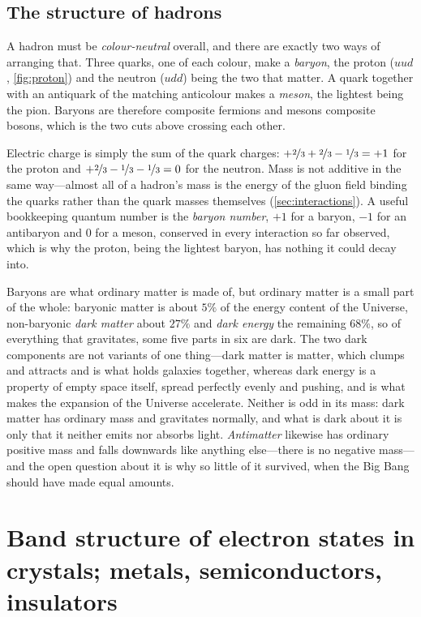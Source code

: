     \subsection{The structure of hadrons}

        A hadron must be \emph{colour-neutral} overall, and there are exactly two ways of arranging that. Three quarks, one of each colour, make a \emph{baryon}, the proton ($uud$, \cref{fig:proton}) and the neutron ($udd$) being the two that matter. A quark together with an antiquark of the matching anticolour makes a \emph{meson}, the lightest being the pion. Baryons are therefore composite fermions and mesons composite bosons, which is the two cuts above crossing each other.

        Electric charge is simply the sum of the quark charges: $+\nicefrac{2}{3}+\nicefrac{2}{3}-\nicefrac{1}{3}=+1$ for the proton and $+\nicefrac{2}{3}-\nicefrac{1}{3}-\nicefrac{1}{3}=0$ for the neutron. Mass is not additive in the same way---almost all of a hadron's mass is the energy of the gluon field binding the quarks rather than the quark masses themselves (\cref{sec:interactions}). A useful bookkeeping quantum number is the \emph{baryon number}, $+1$ for a baryon, $-1$ for an antibaryon and $0$ for a meson, conserved in every interaction so far observed, which is why the proton, being the lightest baryon, has nothing it could decay into.

        Baryons are what ordinary matter is made of, but ordinary matter is a small part of the whole: baryonic matter is about $5\%$ of the energy content of the Universe, non-baryonic \emph{dark matter} about $27\%$ and \emph{dark energy} the remaining $68\%$, so of everything that gravitates, some five parts in six are dark. The two dark components are not variants of one thing---dark matter is matter, which clumps and attracts and is what holds galaxies together, whereas dark energy is a property of empty space itself, spread perfectly evenly and pushing, and is what makes the expansion of the Universe accelerate. Neither is odd in its mass: dark matter has ordinary mass and gravitates normally, and what is dark about it is only that it neither emits nor absorbs light. \emph{Antimatter} likewise has ordinary positive mass and falls downwards like anything else---there is no negative mass---and the open question about it is why so little of it survived, when the Big Bang should have made equal amounts.

\section{Band structure of electron states in crystals; metals, semiconductors, insulators}
\label{sec:bands}

